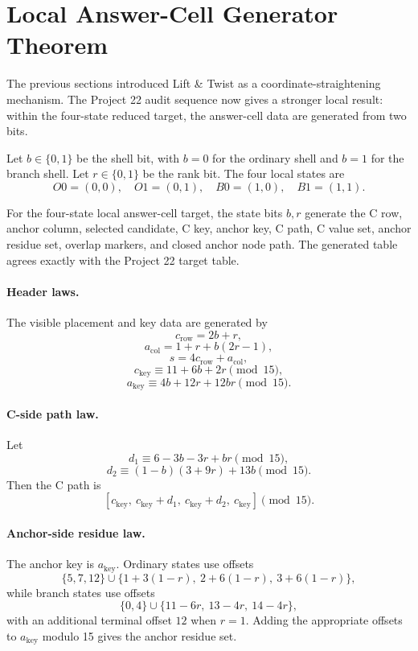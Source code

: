\section{Local Answer-Cell Generator Theorem}

The previous sections introduced Lift \& Twist as a coordinate-straightening mechanism.  The Project 22 audit sequence now gives a stronger local result: within the four-state reduced target, the answer-cell data are generated from two bits.

Let \(b\in\{0,1\}\) be the shell bit, with \(b=0\) for the ordinary shell and \(b=1\) for the branch shell.  Let \(r\in\{0,1\}\) be the rank bit.  The four local states are
\[
    O0=(0,0),\quad
    O1=(0,1),\quad
    B0=(1,0),\quad
    B1=(1,1).
\]

\begin{theorem}
For the four-state local answer-cell target, the state bits \(b,r\) generate the C row, anchor column, selected candidate, C key, anchor key, C path, C value set, anchor residue set, overlap markers, and closed anchor node path.  The generated table agrees exactly with the Project 22 target table.
\end{theorem}

\paragraph{Header laws.}
The visible placement and key data are generated by
\[
    c_{\mathrm{row}} = 2b+r,
\]
\[
    a_{\mathrm{col}} = 1+r+b(2r-1),
\]
\[
    s = 4c_{\mathrm{row}} + a_{\mathrm{col}},
\]
\[
    c_{\mathrm{key}} \equiv 11+6b+2r \pmod{15},
\]
\[
    a_{\mathrm{key}} \equiv 4b+12r+12br \pmod{15}.
\]

\paragraph{C-side path law.}
Let
\[
    d_1 \equiv 6-3b-3r+br \pmod{15},
\]
\[
    d_2 \equiv (1-b)(3+9r)+13b \pmod{15}.
\]
Then the C path is
\[
    [c_{\mathrm{key}},\ c_{\mathrm{key}}+d_1,\ c_{\mathrm{key}}+d_2,\ c_{\mathrm{key}}]\pmod{15}.
\]

\paragraph{Anchor-side residue law.}
The anchor key is \(a_{\mathrm{key}}\).  Ordinary states use offsets
\[
    \{5,7,12\}\cup\{1+3(1-r),\ 2+6(1-r),\ 3+6(1-r)\},
\]
while branch states use offsets
\[
    \{0,4\}\cup\{11-6r,\ 13-4r,\ 14-4r\},
\]
with an additional terminal offset \(12\) when \(r=1\).  Adding the appropriate offsets to \(a_{\mathrm{key}}\) modulo 15 gives the anchor residue set.

